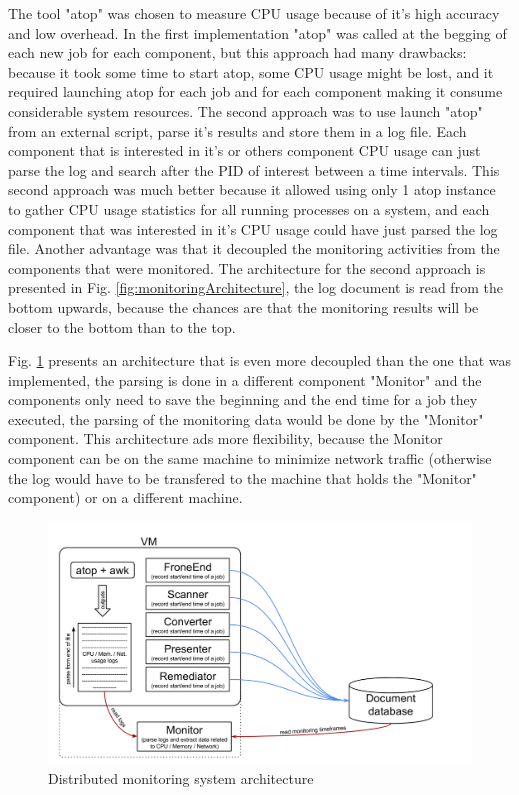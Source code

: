 The tool "atop" was chosen to measure CPU usage because of it's high accuracy and low overhead. In the first implementation "atop" was called at the begging of each new job for each component, but this approach had many drawbacks: because it took some time to start atop, some CPU usage might be lost, and it required launching atop for each job and for each component making it consume considerable system resources. The second approach was to use launch "atop" from an external script, parse it's results and store them in a log file. Each component that is interested in it's or others component CPU usage can just parse the log and search after the PID of interest between a time intervals. This second approach was much better because it allowed using only 1 atop instance to gather CPU usage statistics for all running processes on a system, and each component that was interested in it's CPU usage could have just parsed the log file. Another advantage was that it decoupled the monitoring activities from the components that were monitored. The architecture for the second approach is presented in Fig. \ref{fig:monitoringArchitecture}, the log document is read from the bottom upwards, because the chances are that the monitoring results will be closer to the bottom than to the top.

Fig. \ref{fig:monitoringArchitectureExtended}  presents an architecture that is even more decoupled than the one that was implemented, the parsing is done in a different component "Monitor" and the components only need to save the beginning and the end time for a job they executed, the parsing of the monitoring data would be done by the "Monitor" component. This architecture ads more flexibility, because the Monitor component can be on the same machine to minimize network traffic (otherwise the log would have to be transfered to the machine that holds the "Monitor" component) or on a different machine.


\begin{figure}
\centering
\includegraphics[width=\linewidth]{./img/MonitoringCPUMechanismExtended.png}
\caption{Distributed monitoring system architecture}
\label{fig:monitoringArchitectureExtended}
\end{figure}
